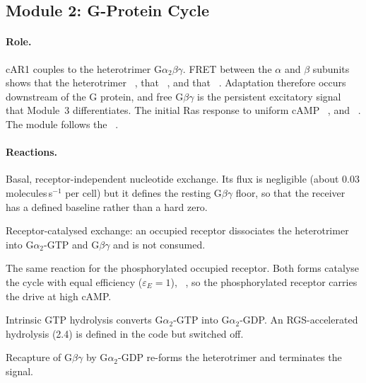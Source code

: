 \subsection{Module 2: G-Protein Cycle}\label{sec:m2}

\paragraph{Role.}
cAR1 couples to the heterotrimer G$\alpha_2\beta\gamma$.
FRET between the $\alpha$ and $\beta$ subunits shows that the heterotrimer ~\cite{janetopoulos2001}, that ~\cite{janetopoulos2001}, and that ~\cite{janetopoulos2001}.
Adaptation therefore occurs downstream of the G protein, and free G$\beta\gamma$ is the persistent excitatory signal that Module~3 differentiates.
The initial Ras response to uniform cAMP ~\cite{kortholt2013}, and ~\cite{kataria2013}.
The module follows the ~\cite{biswas2021}.




\paragraph{Reactions.}
\begin{description}\itemsep0pt
\item[2.0] Basal, receptor-independent nucleotide exchange. Its flux is negligible (about 0.03 molecules\,s$^{-1}$ per cell) but it defines the resting G$\beta\gamma$ floor, so that the receiver has a defined baseline rather than a hard zero.
\item[2.1] Receptor-catalysed exchange: an occupied receptor dissociates the heterotrimer into G$\alpha_2$-GTP and G$\beta\gamma$ and is not consumed.
\item[2.2] The same reaction for the phosphorylated occupied receptor. Both forms catalyse the cycle with equal efficiency ($\varepsilon_E=1$), ~\cite{janetopoulos2001}, so the phosphorylated receptor carries the drive at high cAMP.
\item[2.3] Intrinsic GTP hydrolysis converts G$\alpha_2$-GTP into G$\alpha_2$-GDP. An RGS-accelerated hydrolysis (2.4) is defined in the code but switched off.
\item[2.5] Recapture of G$\beta\gamma$ by G$\alpha_2$-GDP re-forms the heterotrimer and terminates the signal.
\end{description}

